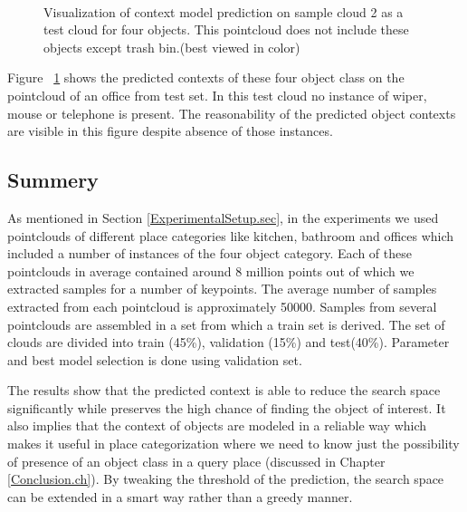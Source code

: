 \begin{figure} [htp]
\begin{center}
     \\
  \end{center}
  \caption[Visualization of context model prediction on sample cloud 2 as a test cloud.]
  {Visualization of context model prediction on sample cloud 2 as a test cloud for four objects. This pointcloud does not include 
  these objects except trash bin.(best viewed in color)}
  \label{ContextPrediction_Test_512.figure:edge}
\end{figure}

Figure ~\ref{ContextPrediction_Test_512.figure:edge} shows the predicted contexts of these four object class on the 
pointcloud of an office from test set.
In this test cloud no instance of wiper, mouse or telephone is present.
The reasonability of the predicted object contexts are visible in this figure despite absence of those instances.

\subsection*{Summery}
As mentioned in Section \ref{ExperimentalSetup.sec}, in the experiments we used pointclouds of different place categories like 
kitchen, bathroom and offices which included a number of instances of the four object category.
Each of these pointclouds in average contained around 8 million points out of which we extracted samples for a number of keypoints.
The average number of samples extracted from each pointcloud is approximately 50000.
Samples from several pointclouds are assembled in a set from which a train set is derived.
The set of clouds are divided into train (45\%), validation (15\%) and test(40\%).
Parameter and best model selection is done using validation set.

The results show that the predicted context is able to reduce the search space significantly while preserves the high chance of
finding the object of interest.
It also implies that the context of objects are modeled in a reliable way which makes it useful in place categorization where
we need to know just the possibility of presence of an object class in a query place (discussed in Chapter \ref{Conclusion.ch}). 
By tweaking the threshold of the prediction, the search space can be extended in a smart way rather than a greedy manner.

